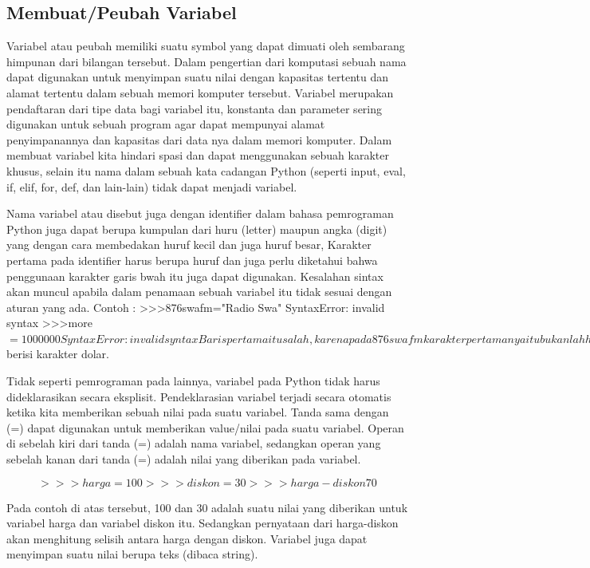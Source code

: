 \subsection{Membuat/Peubah Variabel}
Variabel atau peubah memiliki suatu symbol yang dapat dimuati oleh sembarang himpunan dari bilangan tersebut. Dalam pengertian dari komputasi sebuah nama dapat digunakan untuk menyimpan suatu nilai dengan kapasitas tertentu dan alamat tertentu dalam sebuah memori komputer tersebut. Variabel merupakan pendaftaran dari tipe data bagi variabel itu, konstanta dan parameter sering digunakan untuk sebuah program agar dapat mempunyai alamat penyimpanannya dan kapasitas dari data nya dalam memori komputer. Dalam membuat variabel kita hindari spasi dan dapat menggunakan sebuah karakter khusus, selain itu nama dalam sebuah kata cadangan Python (seperti input, eval, if, elif, for, def, dan lain-lain) tidak dapat menjadi variabel.\cite{irfani2016bahan}

Nama variabel atau disebut juga dengan identifier dalam bahasa pemrograman Python juga dapat berupa kumpulan dari huru (letter) maupun angka (digit) yang dengan cara membedakan huruf kecil dan juga huruf besar, Karakter pertama pada identifier harus berupa huruf dan juga perlu diketahui bahwa penggunaan karakter garis bwah itu juga dapat digunakan.
Kesalahan sintax akan muncul apabila dalam penamaan sebuah variabel itu tidak sesuai dengan aturan yang ada.
Contoh :
>>>876swafm="Radio Swa"
SyntaxError: invalid syntax
>>>more$=1000000
SyntaxError: invalid syntax
Baris pertama itu salah, karena pada 876swafm karakter pertamanya itu bukanlah huruf. Pada baris ketiga juga salah karena pada more$ berisi karakter dolar.

Tidak seperti pemrograman pada lainnya, variabel pada Python tidak harus dideklarasikan secara eksplisit. Pendeklarasian variabel terjadi secara otomatis ketika kita memberikan sebuah nilai pada suatu variabel. Tanda sama dengan (=) dapat digunakan untuk memberikan value/nilai pada suatu variabel. Operan di sebelah kiri dari tanda (=) adalah nama variabel, sedangkan operan yang sebelah kanan dari tanda (=) adalah nilai yang diberikan pada variabel.\cite{utamipemrograman}

\begin{equation}
>>>harga = 100
>>>diskon = 30
>>>harga - diskon
70
\end{equation}

Pada contoh di atas tersebut, 100 dan 30 adalah suatu nilai yang diberikan untuk variabel harga dan variabel diskon itu. Sedangkan pernyataan dari harga-diskon akan menghitung selisih antara harga dengan diskon. Variabel juga dapat menyimpan suatu nilai berupa teks (dibaca string).

